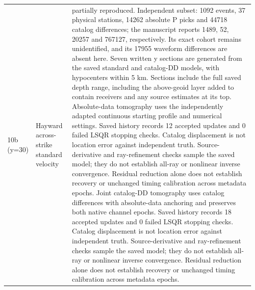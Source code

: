 \begin{longtable}{>{\raggedright\arraybackslash}p{}>{\raggedright\arraybackslash}p{}>{\raggedright\arraybackslash}p{}}
10b (y=30) & Hayward across-strike standard velocity & partially reproduced. Independent subset: 1092 events, 37 physical stations, 14262 absolute P picks and 44718 catalog differences; the manuscript reports 1489, 52, 20257 and 767127, respectively. Its exact cohort remains unidentified, and its 17955 waveform differences are absent here. Seven written y sections are generated from the saved standard and catalog-DD models, with hypocenters within 5 km. Sections include the full saved depth range, including the above-geoid layer added to contain receivers and any source estimates at its top. Absolute-data tomography uses the independently adapted continuous starting profile and numerical settings. Saved history records 12 accepted updates and 0 failed LSQR stopping checks. Catalog displacement is not location error against independent truth. Source-derivative and ray-refinement checks sample the saved model; they do not establish all-ray or nonlinear inverse convergence. Residual reduction alone does not establish recovery or unchanged timing calibration across metadata epochs. Joint catalog-DD tomography uses catalog differences with absolute-data anchoring and preserves both native channel epochs. Saved history records 18 accepted updates and 0 failed LSQR stopping checks. Catalog displacement is not location error against independent truth. Source-derivative and ray-refinement checks sample the saved model; they do not establish all-ray or nonlinear inverse convergence. Residual reduction alone does not establish recovery or unchanged timing calibration across metadata epochs.\\

\end{longtable}
